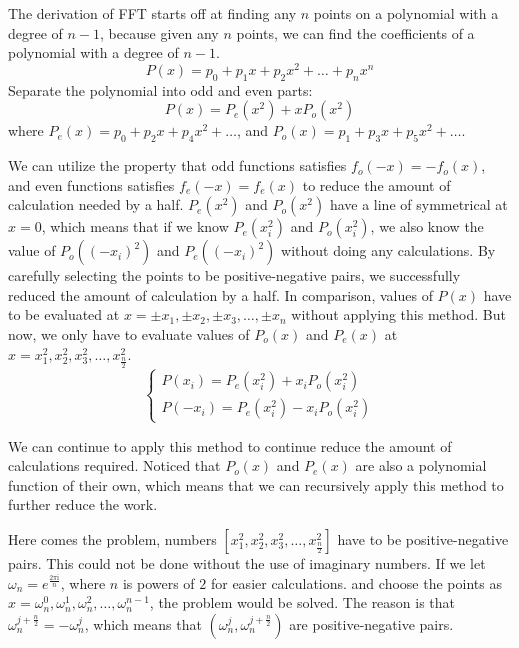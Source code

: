The derivation of FFT starts off at finding any $n$ points on a polynomial with a degree of $n-1$, 
because given any $n$ points, we can find the coefficients of a polynomial with a degree of $n-1$.
$$ P(x) = p_0 + p_1x + p_2x^2 + \dots + p_nx^n $$
Separate the polynomial into odd and even parts:
$$ P(x) = P_e(x^2) + xP_o(x^2) $$
where $P_e(x) = p_0 + p_2x + p_4x^2 + \dots $, and $P_o(x) = p_1 + p_3x + p_5x^2 + \dots $. 

We can utilize the property that odd functions satisfies $f_o(-x)=-f_o(x)$, 
and even functions satisfies $f_e(-x)=f_e(x)$ to reduce the amount of calculation needed by a half. 
$P_e(x^2)$ and $P_o(x^2)$ have a line of symmetrical at $x=0$, 
which means that if we know $P_e(x_i^2)$ and $P_o(x_i^2)$, we also know the value of $P_o((-x_i)^2)$ 
and $P_e((-x_i)^2)$ without doing any calculations. By carefully selecting the points to be positive-negative pairs, 
we successfully reduced the amount of calculation by a half. In comparison, values of $P(x)$ have to be evaluated at 
$x=\pm x_1,\pm x_2,\pm x_3,\dots,\pm x_n$ without applying this method. But now, we only have to evaluate values of 
$P_o(x)$ and $P_e(x)$ at $x=x_1^2,x_2^2,x_3^2,\dots,x_{\frac{n}{2}}^2$.
$$\begin{cases}
    P(x_i) = P_e(x_i^2) + x_iP_o(x_i^2)    \\
    P(-x_i) = P_e(x_i^2) - x_iP_o(x_i^2)
\end{cases}$$

We can continue to apply this method to continue reduce the amount of calculations required. 
Noticed that $P_o(x)$ and $P_e(x)$ are also a polynomial function of their own, 
which means that we can recursively apply this method to further reduce the work. 

Here comes the problem, numbers $[x_1^2,x_2^2,x_3^2,\dots,x_{\frac{n}{2}}^2]$ have to be positive-negative pairs. 
This could not be done without the use of imaginary numbers. If we let $\omega_n = e^{\frac{2\pi \mathrm{i}}{n}}$, 
where $n$ is powers of $2$ for easier calculations.
and choose the points as $x=\omega_n^0,\omega_n^1,\omega_n^2,\dots,\omega_n^{n-1}$, the problem would be solved. 
The reason is that $\omega_n^{j+\frac{n}{2}} = -\omega_n^{j}$, which means that 
$(\omega_n^{j},\omega_n^{j+\frac{n}{2}})$ are positive-negative pairs. 

